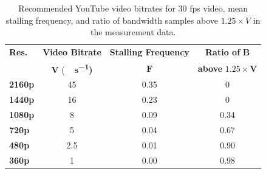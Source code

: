 \begin{table}[!t]
	\caption{Recommended YouTube video bitrates for 30 fps video, mean stalling frequency, and ratio of bandwidth samples above $1.25 \times V$ in the measurement data.}
	\label{tab:recvidbr}
	\begin{tabu}{XSSS}
	\toprule
	\textbf{Res.} & {\textbf{Video Bitrate}} & {\textbf{Stalling Frequency}} & {\textbf{Ratio of} $\mathbf{B}$} \\
	& {$\mathbf{V}$ (\textbf{\si{\mega\bit\per\second})}} & $\mathbf{F}$ & {\textbf{above} $\mathbf{1.25 \times V}$} \\
	\midrule
	\textbf{2160p} & 45 & 0.35 & 0 \\
	\textbf{1440p} & 16 & 0.23 & 0 \\
	\textbf{1080p} & 8 & 0.09 & 0.34 \\
	\textbf{720p} & 5 & 0.04 & 0.67 \\
	\textbf{480p} & 2.5 & 0.01 & 0.90 \\
	\textbf{360p} & 1 & 0.00 & 0.98 \\
	\bottomrule
	\end{tabu}
\end{table}

